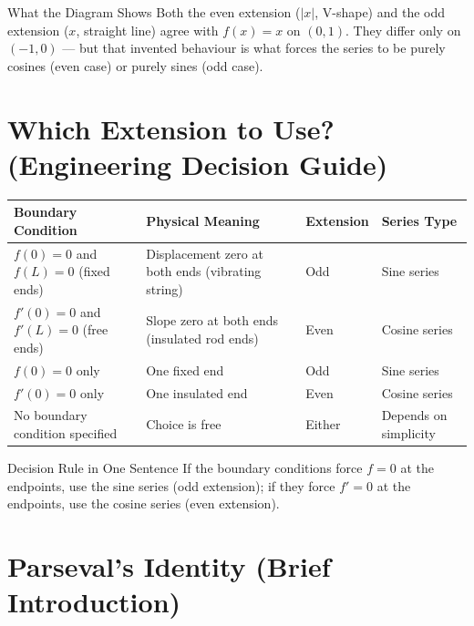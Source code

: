 \documentclass[12pt,a4paper]{article}
\begin{document}
\begin{learnbox}{What the Diagram Shows}
Both the even extension ($|x|$, V-shape) and the odd extension ($x$, straight line) agree with $f(x)=x$ on $(0,1)$. They differ only on $(-1,0)$ --- but that invented behaviour is what forces the series to be purely cosines (even case) or purely sines (odd case).
\end{learnbox}

\section{Which Extension to Use? (Engineering Decision Guide)}

\begin{center}
\begin{tabular}{p{3.8cm} p{3.8cm} p{2.5cm} p{3cm}}
\toprule
\textbf{Boundary Condition} & \textbf{Physical Meaning} & \textbf{Extension} & \textbf{Series Type} \\
\midrule
$f(0)=0$ and $f(L)=0$ (fixed ends) & Displacement zero at both ends (vibrating string) & Odd & Sine series \\
\midrule
$f'(0)=0$ and $f'(L)=0$ (free ends) & Slope zero at both ends (insulated rod ends) & Even & Cosine series \\
\midrule
$f(0)=0$ only & One fixed end & Odd & Sine series \\
\midrule
$f'(0)=0$ only & One insulated end & Even & Cosine series \\
\midrule
No boundary condition specified & Choice is free & Either & Depends on simplicity \\
\bottomrule
\end{tabular}
\end{center}

\begin{learnbox}{Decision Rule in One Sentence}
If the boundary conditions force $f=0$ at the endpoints, use the sine series (odd extension); if they force $f'=0$ at the endpoints, use the cosine series (even extension).
\end{learnbox}

\section{Parseval's Identity (Brief Introduction)}
\end{document}
